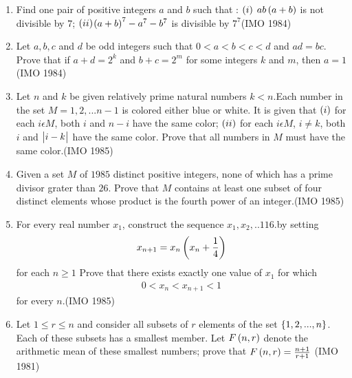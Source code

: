 \begin{enumerate}
\item Find one pair of positive integers $a$ and $b$ such that :
	$\left(i\right)$ $ab\left(a+b\right)$ is not divisible by $7$;
	$\left(ii\right)$$\left(a+b\right)^7-a^7-b^7$ is divisible by $7^7$\hfill(IMO 1984)


\item Let $a,b,c$ and $d$ be odd integers such that  $0<a<b<c<d$ and $ad=bc$. Prove that if $a+d=2^k$ and $b+c=2^m$ for some integers $k$ and   $m$, then $a=1$\hfill(IMO 1984)

\item Let  $n$ and $k$ be given relatively prime natural numbers $k<n$.Each number in the set $M={1,2,...n-1}$ is colored either blue or white. It is given that
	$\left(i\right)$ for each $i  \epsilon   M$, both $i$ and $n-i$ have the same color;
	$\left(ii\right)$ for each $i \epsilon  M$, $i\neq k$, both $i$ and $\begin{vmatrix}i-k\end{vmatrix}$ have the same color. Prove that all numbers in $M$ must have the same color.\hfill(IMO 1985)

\item Given a set $M$ of $1985$ distinct positive integers, none of which has a prime divisor grater than $26$. Prove that $M$ contains at least one subset of four distinct elements whose product is the fourth power of an integer.\hfill(IMO 1985)


\item For every real number $x_1$, construct the sequence $x_1, x_2, ..116  . $by setting 
	\begin{align*} x_{n+1}=x_n\left(x_n+\frac{1}{4}\right)\end{align*} for each $n \geq 1$ Prove that there exists exactly one value of $x_1$ for which  \begin{align*} 
0 < x_n<x_{n+1}<1 \end{align*} for every $n$.\hfill(IMO 1985)
\item Let $1 \leq r \leq n$ and consider all subsets of $r$ elements of the set $\left\{1,2,..., n\right\}$. Each of these subsets has a smallest  member. Let $F\left(n,r\right)$ denote the arithmetic mean of these smallest numbers; prove that $F\left(n,r\right)= \frac{n+1}{r+1}$ \hfill(IMO 1981)



\end{enumerate}

